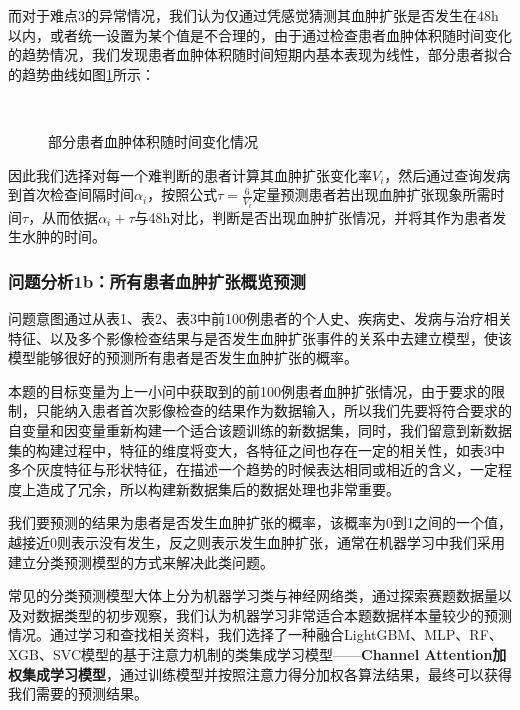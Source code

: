 \documentclass[bwprint]{gmcmthesis}
\begin{document}
				而对于难点3的异常情况，我们认为仅通过凭感觉猜测其血肿扩张是否发生在48h以内，或者统一设置为某个值是不合理的，由于通过检查患者血肿体积随时间变化的趋势情况，我们发现患者血肿体积随时间短期内基本表现为线性，部分患者拟合的趋势曲线如图\ref{fig:four pic}所示：
				
				
				\begin{figure}[H]
					\centering
					\qquad
					 \\
					\qquad
					\caption{部分患者血肿体积随时间变化情况}
					\label{fig:four pic}
				\end{figure}
				
				因此我们选择对每一个难判断的患者计算其血肿扩张变化率$V_i$，然后通过查询发病到首次检查间隔时间$\alpha_i$，按照公式$\tau=\frac{6}{V_i}$定量预测患者若出现血肿扩张现象所需时间$\tau$，从而依据$\alpha_i+\tau$与48h对比，判断是否出现血肿扩张情况，并将其作为患者发生水肿的时间。
				
				
				
				
			\subsubsection{问题分析1b：所有患者血肿扩张概览预测}
				问题意图通过从表1、表2、表3中前100例患者的个人史、疾病史、发病与治疗相关特征、以及多个影像检查结果与是否发生血肿扩张事件的关系中去建立模型，使该模型能够很好的预测所有患者是否发生血肿扩张的概率。
				
				本题的目标变量为上一小问中获取到的前100例患者血肿扩张情况，由于要求的限制，只能纳入患者首次影像检查的结果作为数据输入，所以我们先要将符合要求的自变量和因变量重新构建一个适合该题训练的新数据集，同时，我们留意到新数据集的构建过程中，特征的维度将变大，各特征之间也存在一定的相关性，如表3中多个灰度特征与形状特征，在描述一个趋势的时候表达相同或相近的含义，一定程度上造成了冗余，所以构建新数据集后的数据处理也非常重要。
				
				我们要预测的结果为患者是否发生血肿扩张的概率，该概率为0到1之间的一个值，越接近0则表示没有发生，反之则表示发生血肿扩张，通常在机器学习中我们采用建立分类预测模型的方式来解决此类问题。
				
				常见的分类预测模型大体上分为机器学习类与神经网络类，通过探索赛题数据量以及对数据类型的初步观察，我们认为机器学习非常适合本题数据样本量较少的预测情况。通过学习和查找相关资料，我们选择了一种融合LightGBM、MLP、RF、XGB、SVC模型的基于注意力机制的类集成学习模型——\textbf{Channel Attention加权集成学习模型}，通过训练模型并按照注意力得分加权各算法结果，最终可以获得我们需要的预测结果。
				
\end{document}
